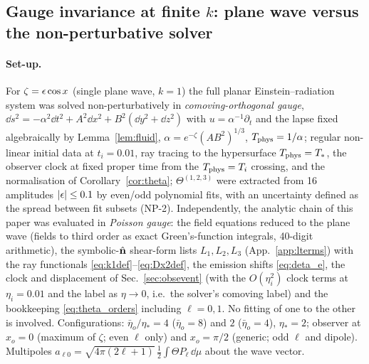 \subsection{Gauge invariance at finite \texorpdfstring{$k$}{k}: plane wave versus the non-perturbative solver}
\label{sec:check_endtoend}
\paragraph{Set-up.}  For $\zeta=\epsilon\cos x$ (single plane wave, $k=1$) the full planar Einstein--radiation system was solved
non-perturbatively in \emph{comoving-orthogonal gauge}, $\dd s^2=-\alpha^2\dd t^2+A^2\dd x^2+B^2(\dd y^2+\dd z^2)$ with $u=\alpha^{-1}\partial_t$ and the lapse
fixed algebraically by Lemma~\ref{lem:fluid}, $\alpha=e^{-\zeta}(AB^2)^{1/3}$, $T_{\rm phys}=1/\alpha$; regular non-linear initial data at $t_i=0.01$, ray
tracing to the hypersurface $T_{\rm phys}=T_*$, the observer clock at fixed proper time from the $T_{\rm phys}=T_i$ crossing, and the normalisation of
Corollary~\ref{cor:theta}; $\Theta^{(1,2,3)}$ were extracted from 16 amplitudes $|\epsilon|\le0.1$ by even/odd polynomial fits, with an uncertainty
defined as the spread between fit subsets (NP-2).  Independently, the analytic chain of this paper was evaluated in \emph{Poisson gauge}: the
field equations reduced to the plane wave (fields to third order as exact Green's-function integrals, 40-digit arithmetic), the
symbolic-$\hat{\mathbf n}$ shear-form lists $L_1,L_2,L_3$ (App.~\ref{app:lterms}) with the ray functionals \eqref{eq:k1def}--\eqref{eq:Dx2def}, the emission
shifts \eqref{eq:deta_e}, the clock and displacement of Sec.~\ref{sec:obsevent} (with the $O(\eta_i^2)$ clock terms at $\eta_i=0.01$ and the
label as $\eta\to0$, i.e.\ the solver's comoving label) and the bookkeeping \eqref{eq:theta_orders} including $\ell=0,1$.  No fitting of one to
the other is involved.  Configurations: $\bar\eta_o/\eta_*=4$ ($\bar\eta_o=8$) and $2$ ($\bar\eta_o=4$), $\eta_*=2$; observer at $x_o=0$ (maximum
of $\zeta$; even $\ell$ only) and $x_o=\pi/2$ (generic; odd $\ell$ and dipole).  Multipoles $a_{\ell0}=\sqrt{4\pi(2\ell+1)}\,\tfrac12\int\Theta P_\ell\,\dd\mu$
about the wave vector.

